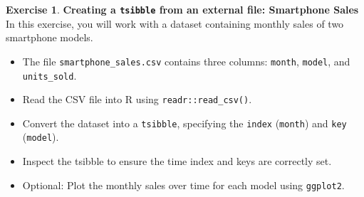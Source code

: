 \documentclass[a4,a4paper,10pt,notitlepage,english]{article}
\theoremstyle{definition}
\newtheorem{exo}{Exercise}
\begin{document}
\bigskip
\newpage

\begin{exo}
    \textbf{Creating a \texttt{tsibble} from an external file: Smartphone Sales}\\

    In this exercise, you will work with a dataset containing monthly sales of two smartphone models.
    \begin{itemize}
        \item The file \texttt{smartphone\_sales.csv} contains three columns: \texttt{month}, \texttt{model}, and \texttt{units\_sold}.
        \item Read the CSV file into R using \texttt{readr::read\_csv()}.
        \item Convert the dataset into a \texttt{tsibble}, specifying the \texttt{index} (\texttt{month}) and \texttt{key} (\texttt{model}).
        \item Inspect the tsibble to ensure the time index and keys are correctly set.
        \item Optional: Plot the monthly sales over time for each model using \texttt{ggplot2}.
    \end{itemize}
\end{exo}
	
	
	
\end{document}
